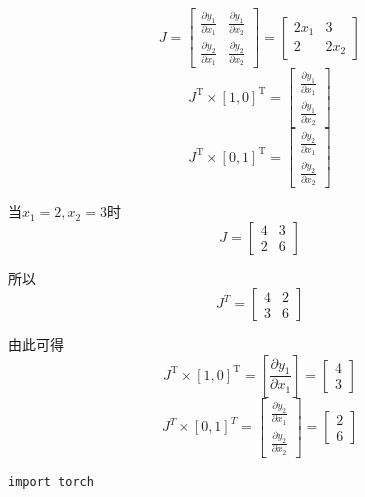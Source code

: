 \begin{enumerate}[label=\arabic*)]
\begin{example}
                $$J=\begin{bmatrix}\frac{\partial y_1}{\partial x_1}&\frac{\partial y_1}{\partial x_2}\\\frac{\partial y_2}{\partial x_1}&\frac{\partial y_2}{\partial x_2}\end{bmatrix}=\begin{bmatrix}2x_1&3\\2&2x_2\end{bmatrix}$$
                $$J^{\mathrm{T}}\times\left[1,0\right]^{\mathrm{T}}=\left[\begin{matrix}\frac{\partial y_{1}}{\partial x_{1}}\\\frac{\partial y_{1}}{\partial x_{2}}\end{matrix}\right]$$
                $$J^{\mathrm{T}}\times\left[0,1\right]^{\mathrm{T}}=\left[\begin{matrix}\frac{\partial y_{2}}{\partial x_{1}}\\\frac{\partial y_{2}}{\partial x_{2}}\end{matrix}\right]$$

                当$x_1=2,x_2=3$时
                $$J=\begin{bmatrix}4&3\\2&6\end{bmatrix}$$

                所以 
                $$J^{T}=\begin{bmatrix}4&2\\3&6\end{bmatrix}$$

                由此可得
                $$J^{\mathrm{T}}\times\left[1,0\right]^{\mathrm{T}}=\left[\frac{\partial y_{1}}{\partial x_{1}}\right]=\left[\begin{matrix}4\\3\end{matrix}\right]$$
                $$J^{T}\times\left[0,1\right]^{T}=\begin{bmatrix}\frac{\partial y_{2}}{\partial x_{1}}\\\frac{\partial y_{2}}{\partial x_{2}}\end{bmatrix}=\begin{bmatrix}2\\6\end{bmatrix}$$
        \end{example}
        
        \begin{lstlisting}[style=pythonstyle]
        import torch


\end{lstlisting}
\end{enumerate}
